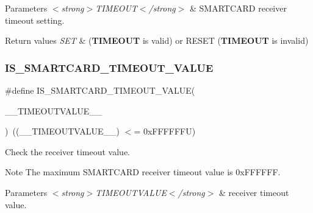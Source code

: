 \begin{DoxyParams}{Parameters}
{\em $<$strong$>$\+T\+I\+M\+E\+O\+U\+T$<$/strong$>$} & S\+M\+A\+R\+T\+C\+A\+RD receiver timeout setting. \\
\hline
\end{DoxyParams}

\begin{DoxyRetVals}{Return values}
{\em S\+ET} & ({\bfseries T\+I\+M\+E\+O\+UT} is valid) or R\+E\+S\+ET ({\bfseries T\+I\+M\+E\+O\+UT} is invalid) \\
\hline
\end{DoxyRetVals}
\mbox{\label{group___s_m_a_r_t_c_a_r_d___private___macros_gaa813ac55690877657161d7f282820b03}} 
\subsubsection{\texorpdfstring{I\+S\+\_\+\+S\+M\+A\+R\+T\+C\+A\+R\+D\+\_\+\+T\+I\+M\+E\+O\+U\+T\+\_\+\+V\+A\+L\+UE}{IS\_SMARTCARD\_TIMEOUT\_VALUE}}
{\footnotesize\ttfamily \#define I\+S\+\_\+\+S\+M\+A\+R\+T\+C\+A\+R\+D\+\_\+\+T\+I\+M\+E\+O\+U\+T\+\_\+\+V\+A\+L\+UE(\begin{DoxyParamCaption}\item[{}]{\+\_\+\+\_\+\+T\+I\+M\+E\+O\+U\+T\+V\+A\+L\+U\+E\+\_\+\+\_\+ }\end{DoxyParamCaption})~((\+\_\+\+\_\+\+T\+I\+M\+E\+O\+U\+T\+V\+A\+L\+U\+E\+\_\+\+\_\+) $<$= 0x\+F\+F\+F\+F\+F\+F\+U)}



Check the receiver timeout value. 

\begin{DoxyNote}{Note}
The maximum S\+M\+A\+R\+T\+C\+A\+RD receiver timeout value is 0x\+F\+F\+F\+F\+FF. 
\end{DoxyNote}

\begin{DoxyParams}{Parameters}
{\em $<$strong$>$\+T\+I\+M\+E\+O\+U\+T\+V\+A\+L\+U\+E$<$/strong$>$} & receiver timeout value. \\
\hline
\end{DoxyParams}

